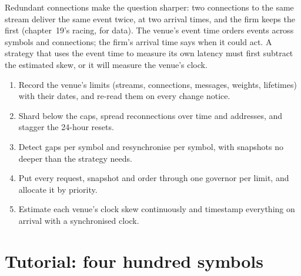 Redundant connections make the question sharper: two connections to the same stream deliver the same event twice, at two arrival times, and the
firm keeps the first (chapter~19's racing, for data). The venue's event time orders events across symbols and connections; the firm's arrival time
says when it could act. A strategy that uses the event time to measure its own latency must first subtract the estimated skew, or it will measure
the venue's clock.

\begin{method}\label{met:nw:api-engineering-for-crypto-venues:run}
\begin{enumerate}
\item Record the venue's limits (streams, connections, messages, weights, lifetimes) with their dates, and re-read them on every change notice.
\item Shard below the caps, spread reconnections over time and addresses, and stagger the 24-hour resets.
\item Detect gaps per symbol and resynchronise per symbol, with snapshots no deeper than the strategy needs.
\item Put every request, snapshot and order through one governor per limit, and allocate it by priority.
\item Estimate each venue's clock skew continuously and timestamp everything on arrival with a synchronised clock.
\end{enumerate}
\end{method}

\section{Tutorial: four hundred symbols}\label{tut:nw:api-engineering-for-crypto-venues:tut}

